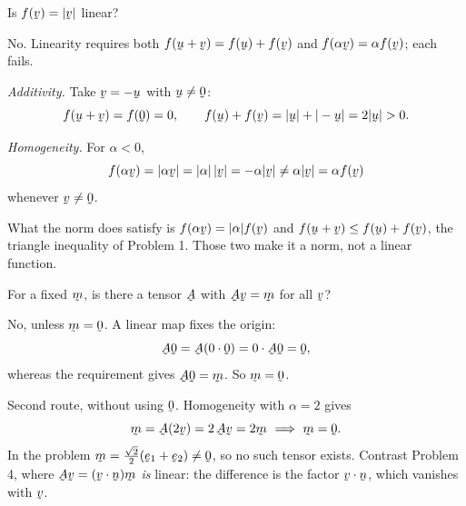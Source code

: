 \begin{problem}
Is $f(\bv)=|\bv|$ linear?
\end{problem}
\begin{solution}
No. Linearity requires both $f(\bu+\bv)=f(\bu)+f(\bv)$ and
$f(\alpha\bv)=\alpha f(\bv)$; each fails.

\emph{Additivity.} Take $\bv=-\bu$ with $\bu\neq\bze$:
\[
   f(\bu+\bv)=f(\bze)=0,\qquad
   f(\bu)+f(\bv)=|\bu|+|-\bu|=2|\bu|>0 .
\]

\emph{Homogeneity.} For $\alpha<0$,
\[
   f(\alpha\bv)=|\alpha\bv|=|\alpha|\,|\bv|=-\alpha|\bv|
   \neq\alpha|\bv|=\alpha f(\bv)
\]
whenever $\bv\neq\bze$.

What the norm does satisfy is $f(\alpha\bv)=|\alpha|f(\bv)$ and
$f(\bu+\bv)\le f(\bu)+f(\bv)$, the triangle inequality of Problem 1. Those
two make it a norm, not a linear function.
\end{solution}

\begin{problem}
For a fixed $\bmv$, is there a tensor $\bA$ with $\bA\bv=\bmv$ for all
$\bv$?
\end{problem}
\begin{solution}
No, unless $\bmv=\bze$. A linear map fixes the origin:
\[
   \bA\bze=\bA(0\cdot\bze)=0\cdot\bA\bze=\bze ,
\]
whereas the requirement gives $\bA\bze=\bmv$. So $\bmv=\bze$.

Second route, without using $\bze$. Homogeneity with $\alpha=2$ gives
\[
   \bmv=\bA(2\bv)=2\,\bA\bv=2\bmv
   \ \Longrightarrow\ \bmv=\bze .
\]
In the problem $\bmv=\tfrac{\sqrt2}{2}(\be_{1}+\be_{2})\neq\bze$, so no
such tensor exists. Contrast Problem 4, where $\bA\bv=(\ip\bv\bn)\bmv$
\emph{is} linear: the difference is the factor $\ip\bv\bn$, which vanishes
with $\bv$.
\end{solution}

